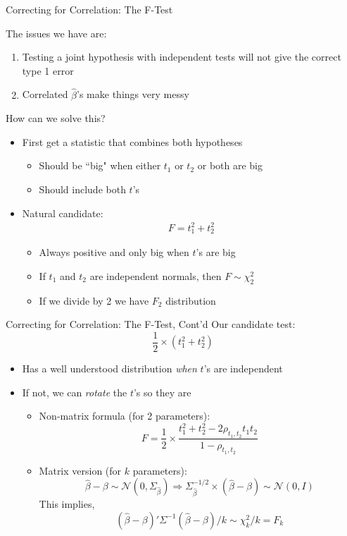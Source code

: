 \begin{frame}{Correcting for Correlation: The F-Test}

The issues we have are:
\begin{enumerate}
	\item Testing a joint hypothesis with independent tests will not give the correct type 1 error
	\item Correlated $\hat\beta$'s make things very messy	
\end{enumerate}

 How can we solve this?

\begin{itemize}
	\item First get a statistic that combines both hypotheses
		\begin{itemize}
			\item Should be ``big" when either $t_1$ or $t_2$ or both are big
			\item Should include both $t$'s
		\end{itemize}
	\item Natural candidate:
		\begin{align*}
			F = t_1^2 + t_2^2
		\end{align*}
	\begin{itemize}
		\item Always positive and only big when $t$'s are big
		\item If $t_1$ and $t_2$ are independent normals, then $F\sim \chi^2_2$
		\item If we divide by 2 we have $F_2$ distribution
	\end{itemize}
\end{itemize}	
\end{frame}

\begin{frame}{Correcting for Correlation: The F-Test, Cont'd}
Our candidate test:
	\[
		\frac{1}{2}\times (t_1^2 + t_2^2)
	\]

\begin{itemize}
	\item Has a well understood distribution \emph{when} $t$'s are independent
	\item If not, we can \emph{rotate} the $t$'s so they are
	\begin{itemize}
		\item Non-matrix formula (for 2 parameters):
		\[
			F = \frac{1}{2}\times\frac{t_1^2 + t_2^2 - 2\rho_{t_1,t_2}t_1t_2}{1-\rho_{t_1,t_2}}
		\]
		\item Matrix version (for $k$ parameters):
		\[
			\hat\beta-\beta\sim\mathcal{N}\left(0,\Sigma_{\hat\beta}\right)\Rightarrow \Sigma_{\hat\beta}^{-1/2}\times\left(\hat\beta-\beta\right)\sim\mathcal{N}(0,I)
		\]
		This implies,
		\[
		(\hat\beta-\beta)'\Sigma^{-1}(\hat\beta-\beta)/k\sim\chi^2_k/k = F_k
		\]
		
		
	\end{itemize}	
\end{itemize}	
\end{frame}

